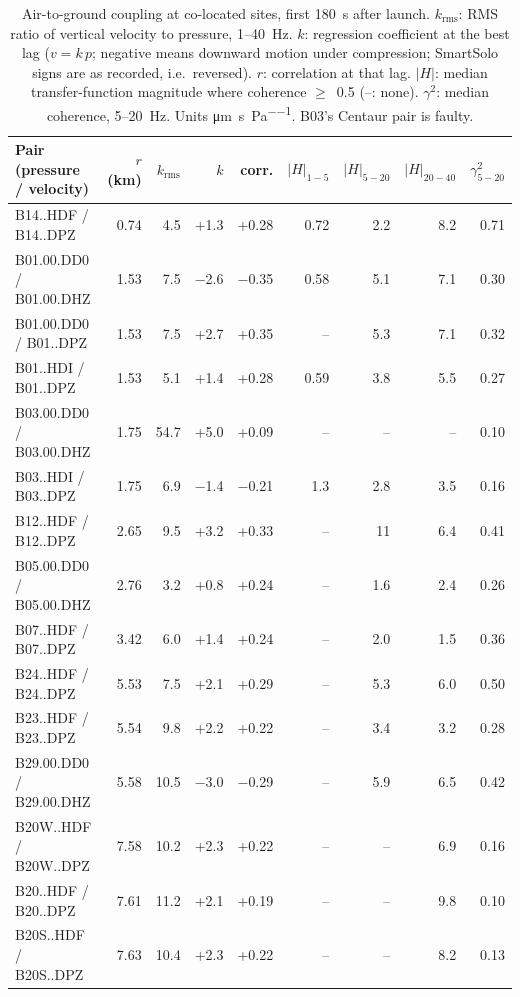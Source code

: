 \documentclass[]{seismica}
\begin{document}
\begin{table}[htbp]
  \centering
  \caption{Air-to-ground coupling at co-located sites, first 180~s after
    launch. $k_\text{rms}$: RMS ratio of vertical velocity to pressure,
    1--40~Hz. $k$: regression coefficient at the best lag ($v = k\,p$;
    negative means downward motion under compression; SmartSolo signs
    are as recorded, i.e.\ reversed). $r$: correlation at that lag.
    $|H|$: median transfer-function magnitude where coherence
    $\geq$~0.5 (--: none). $\gamma^2$: median coherence, 5--20~Hz.
    Units \si{\micro\metre\per\second\per\pascal}. B03's Centaur pair is
    faulty.}
  \label{tab:coupling}
  \scriptsize
  \begin{tabular}{lrrrrrrrr}
    \toprule
    Pair (pressure / velocity) & $r$ (km) & $k_\text{rms}$ & $k$ & corr. & $|H|_{1-5}$ & $|H|_{5-20}$ & $|H|_{20-40}$ & $\gamma^2_{5-20}$ \\
    \midrule
    B14..HDF / B14..DPZ & 0.74 & 4.5 & +1.3 & +0.28 & 0.72 & 2.2 & 8.2 & 0.71 \\
    B01.00.DD0 / B01.00.DHZ & 1.53 & 7.5 & $-$2.6 & $-$0.35 & 0.58 & 5.1 & 7.1 & 0.30 \\
    B01.00.DD0 / B01..DPZ & 1.53 & 7.5 & +2.7 & +0.35 & -- & 5.3 & 7.1 & 0.32 \\
    B01..HDI / B01..DPZ & 1.53 & 5.1 & +1.4 & +0.28 & 0.59 & 3.8 & 5.5 & 0.27 \\
    B03.00.DD0 / B03.00.DHZ & 1.75 & 54.7 & +5.0 & +0.09 & -- & -- & -- & 0.10 \\
    B03..HDI / B03..DPZ & 1.75 & 6.9 & $-$1.4 & $-$0.21 & 1.3 & 2.8 & 3.5 & 0.16 \\
    B12..HDF / B12..DPZ & 2.65 & 9.5 & +3.2 & +0.33 & -- & 11 & 6.4 & 0.41 \\
    B05.00.DD0 / B05.00.DHZ & 2.76 & 3.2 & +0.8 & +0.24 & -- & 1.6 & 2.4 & 0.26 \\
    B07..HDF / B07..DPZ & 3.42 & 6.0 & +1.4 & +0.24 & -- & 2.0 & 1.5 & 0.36 \\
    B24..HDF / B24..DPZ & 5.53 & 7.5 & +2.1 & +0.29 & -- & 5.3 & 6.0 & 0.50 \\
    B23..HDF / B23..DPZ & 5.54 & 9.8 & +2.2 & +0.22 & -- & 3.4 & 3.2 & 0.28 \\
    B29.00.DD0 / B29.00.DHZ & 5.58 & 10.5 & $-$3.0 & $-$0.29 & -- & 5.9 & 6.5 & 0.42 \\
    B20W..HDF / B20W..DPZ & 7.58 & 10.2 & +2.3 & +0.22 & -- & -- & 6.9 & 0.16 \\
    B20..HDF / B20..DPZ & 7.61 & 11.2 & +2.1 & +0.19 & -- & -- & 9.8 & 0.10 \\
    B20S..HDF / B20S..DPZ & 7.63 & 10.4 & +2.3 & +0.22 & -- & -- & 8.2 & 0.13 \\
    \bottomrule
  \end{tabular}
\end{table}
\end{document}

